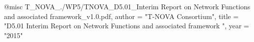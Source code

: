 @misc{ T_NOVA_./WP5/TNOVA_D5.01_Interim Report on Network Functions and associated framework_v1.0.pdf,
       author = "T-NOVA Consortium",
       title = "D5.01 Interim Report on Network Functions and associated framework ",
       year = "2015" }
